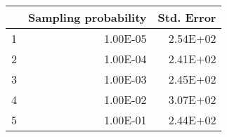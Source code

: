 \begin{table}[ht]
\centering
\begin{tabular}{rrr}
  \hline
 & Sampling probability & Std. Error \\ 
  \hline
1 & 1.00E-05 & 2.54E+02 \\ 
  2 & 1.00E-04 & 2.41E+02 \\ 
  3 & 1.00E-03 & 2.45E+02 \\ 
  4 & 1.00E-02 & 3.07E+02 \\ 
  5 & 1.00E-01 & 2.44E+02 \\ 
   \hline
\end{tabular}
\end{table}
